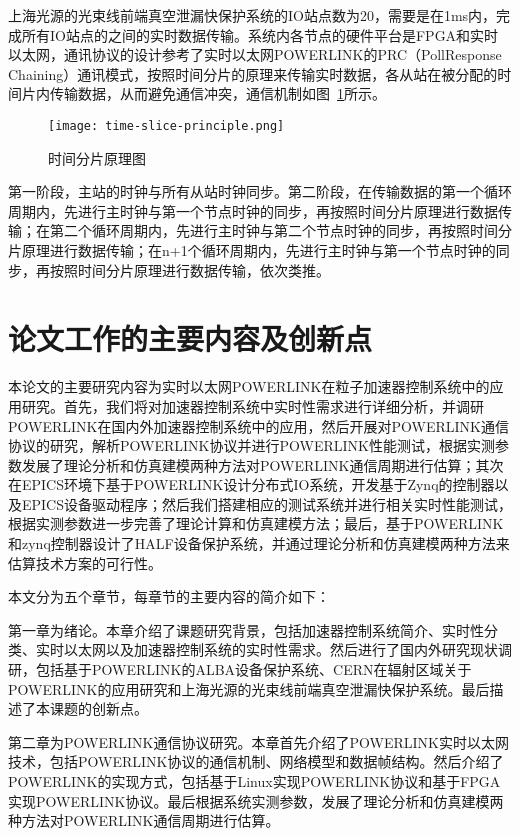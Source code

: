 上海光源的光束线前端真空泄漏快保护系统的IO站点数为20，需要是在1ms内，完成所有IO站点的之间的实时数据传输\cite{liu-2010}。系统内各节点的硬件平台是FPGA和实时以太网，通讯协议的设计参考了实时以太网POWERLINK的PRC（PollResponse Chaining）通讯模式，按照时间分片的原理来传输实时数据，各从站在被分配的时间片内传输数据，从而避免通信冲突，通信机制如图~\ref{fig:time-slice-principle}所示。

\begin{figure}[!htb]
	\centering
	\texttt{[image: time-slice-principle.png]}
	\caption{时间分片原理图}
	\label{fig:time-slice-principle}
\end{figure}

第一阶段，主站的时钟与所有从站时钟同步。第二阶段，在传输数据的第一个循环周期内，先进行主时钟与第一个节点时钟的同步，再按照时间分片原理进行数据传输；在第二个循环周期内，先进行主时钟与第二个节点时钟的同步，再按照时间分片原理进行数据传输；在n+1个循环周期内，先进行主时钟与第一个节点时钟的同步，再按照时间分片原理进行数据传输，依次类推。


\section{论文工作的主要内容及创新点}

本论文的主要研究内容为实时以太网POWERLINK在粒子加速器控制系统中的应用研究。首先，我们将对加速器控制系统中实时性需求进行详细分析，并调研POWERLINK在国内外加速器控制系统中的应用，然后开展对POWERLINK通信协议的研究，解析POWERLINK协议并进行POWERLINK性能测试，根据实测参数发展了理论分析和仿真建模两种方法对POWERLINK通信周期进行估算；其次在EPICS环境下基于POWERLINK设计分布式IO系统，开发基于Zynq的控制器以及EPICS设备驱动程序；然后我们搭建相应的测试系统并进行相关实时性能测试，根据实测参数进一步完善了理论计算和仿真建模方法；最后，基于POWERLINK和zynq控制器设计了HALF设备保护系统，并通过理论分析和仿真建模两种方法来估算技术方案的可行性。

本文分为五个章节，每章节的主要内容的简介如下：

第一章为绪论。本章介绍了课题研究背景，包括加速器控制系统简介、实时性分类、实时以太网以及加速器控制系统的实时性需求。然后进行了国内外研究现状调研，包括基于POWERLINK的ALBA设备保护系统、CERN在辐射区域关于POWERLINK的应用研究和上海光源的光束线前端真空泄漏快保护系统。最后描述了本课题的创新点。

第二章为POWERLINK通信协议研究。本章首先介绍了POWERLINK实时以太网技术，包括POWERLINK协议的通信机制、网络模型和数据帧结构。然后介绍了POWERLINK的实现方式，包括基于Linux实现POWERLINK协议和基于FPGA实现POWERLINK协议。最后根据系统实测参数，发展了理论分析和仿真建模两种方法对POWERLINK通信周期进行估算。

